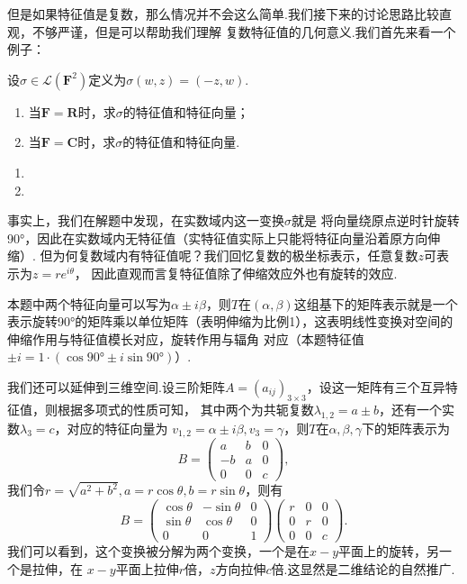 但是如果特征值是复数，那么情况并不会这么简单.我们接下来的讨论思路比较直观，不够严谨，但是可以帮助我们理解
复数特征值的几何意义.我们首先来看一个例子：
\begin{example}
    设$\sigma\in\mathcal{L}(\mathbf{F}^2)$定义为$\sigma(w,z)=(-z,w)$.
    \begin{enumerate}[label=(\arabic*)]
        \item 当$\mathbf{F}=\mathbf{R}$时，求$\sigma$的特征值和特征向量；
        \item 当$\mathbf{F}=\mathbf{C}$时，求$\sigma$的特征值和特征向量.
    \end{enumerate}
\end{example}
\begin{solution}
    \begin{enumerate}[label=(\arabic*)]
        \item 
        \item 
    \end{enumerate}
\end{solution}

事实上，我们在解题中发现，在实数域内这一变换$\sigma$就是
将向量绕原点逆时针旋转90°，因此在实数域内无特征值（实特征值实际上只能将特征向量沿着原方向伸缩）.
但为何复数域内有特征值呢？我们回忆复数的极坐标表示，任意复数$z$可表示为$z=re^{i\theta}$，
因此直观而言复特征值除了伸缩效应外也有旋转的效应.

本题中两个特征向量可以写为$\alpha\pm i\beta$，则$T$在$(\alpha,\beta)$这组基下的矩阵表示就是一个
表示旋转90°的矩阵乘以单位矩阵（表明伸缩为比例1），这表明线性变换对空间的伸缩作用与特征值模长对应，旋转作用与辐角
对应（本题特征值$\pm i=1\cdot(\cos 90°\pm i\sin 90°)$）.

我们还可以延伸到三维空间.设三阶矩阵$A=(a_{ij})_{3\times 3}$，设这一矩阵有三个互异特征值，则根据多项式的性质可知，
其中两个为共轭复数$\lambda_{1,2}=a\pm b$，还有一个实数$\lambda_3=c$，对应的特征向量为
$v_{1,2}=\alpha\pm i\beta,v_3=\gamma$，则$T$在$\alpha,\beta,\gamma$下的矩阵表示为
$$B=\begin{pmatrix}
	a & b & 0 \\ -b & a & 0 \\ 0 & 0 & c
\end{pmatrix},$$
我们令$r=\sqrt{a^2+b^2},a=r\cos\theta,b=r\sin\theta$，则有
$$B=\begin{pmatrix}
	\cos\theta & -\sin\theta & 0 \\ \sin\theta & \cos\theta & 0 \\ 0 & 0 & 1
\end{pmatrix}\begin{pmatrix}
	r & 0 & 0 \\ 0 & r & 0 \\ 0 & 0 & c
\end{pmatrix}.$$
我们可以看到，这个变换被分解为两个变换，一个是在$x-y$平面上的旋转，另一个是拉伸，在
$x-y$平面上拉伸$r$倍，$z$方向拉伸$c$倍.这显然是二维结论的自然推广.

